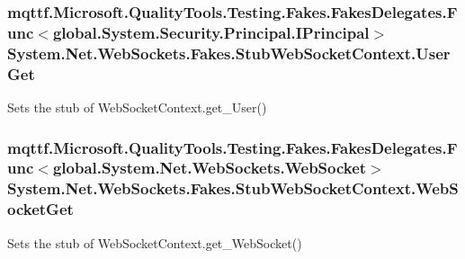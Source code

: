 \hypertarget{class_system_1_1_net_1_1_web_sockets_1_1_fakes_1_1_stub_web_socket_context_a7b3a37ebd24c9dacbe207af51630b3f6}{
\subsubsection[{User\-Get}]{\setlength{\rightskip}{0pt plus 5cm}mqttf.\-Microsoft.\-Quality\-Tools.\-Testing.\-Fakes.\-Fakes\-Delegates.\-Func$<$global.\-System.\-Security.\-Principal.\-I\-Principal$>$ System.\-Net.\-Web\-Sockets.\-Fakes.\-Stub\-Web\-Socket\-Context.\-User\-Get}}\label{class_system_1_1_net_1_1_web_sockets_1_1_fakes_1_1_stub_web_socket_context_a7b3a37ebd24c9dacbe207af51630b3f6}


Sets the stub of Web\-Socket\-Context.\-get\-\_\-\-User()

\hypertarget{class_system_1_1_net_1_1_web_sockets_1_1_fakes_1_1_stub_web_socket_context_a240591e085b213e062358cd486e93a1c}{
\subsubsection[{Web\-Socket\-Get}]{\setlength{\rightskip}{0pt plus 5cm}mqttf.\-Microsoft.\-Quality\-Tools.\-Testing.\-Fakes.\-Fakes\-Delegates.\-Func$<$global.\-System.\-Net.\-Web\-Sockets.\-Web\-Socket$>$ System.\-Net.\-Web\-Sockets.\-Fakes.\-Stub\-Web\-Socket\-Context.\-Web\-Socket\-Get}}\label{class_system_1_1_net_1_1_web_sockets_1_1_fakes_1_1_stub_web_socket_context_a240591e085b213e062358cd486e93a1c}


Sets the stub of Web\-Socket\-Context.\-get\-\_\-\-Web\-Socket()



